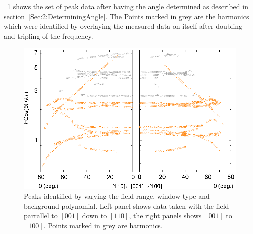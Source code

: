 \Fig~\ref{Fig:3:AngleSweepMeasured} shows the set of peak data after having the angle determined as described in section~\ref{Sec:2:DeterminingAngle}. The Points marked in grey are the harmonics which were identified by overlaying the measured data on itself after doubling and tripling of the frequency.
\begin{figure}[h!]
    \begin{center}
        \includegraphics[scale=0.7]{Chapter3-dHvABaFe2P2/Figures/AngleDepMeasurements/AngleSweepMeasured/AngleSweepMeasured}
        \caption{Peaks identified by varying the field range, window type and background polynomial. Left panel shows data taken with the field parrallel to $[001]$ down to $[110]$, the right panels shows $[001]$ to $[100]$. Points marked in grey are harmonics.}
        \label{Fig:3:AngleSweepMeasured}
    \end{center}
\end{figure}

